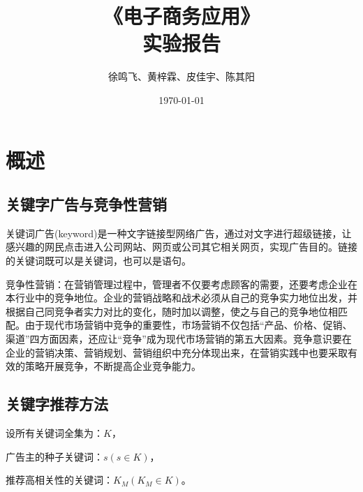 \documentclass[12pt, a4paper, oneside]{ctexbook}
\title{{\Huge{\textbf{《电子商务应用》}}}\\实验报告}
\author{徐鸣飞、黄梓霖、皮佳宇、陈其阳}
\date{\today}
\begin{document}
\maketitle

\setcounter{page}{1}



\newpage
{}
\setcounter{page}{1}
\tableofcontents
\newpage
\setcounter{page}{1}

\chapter{概述}
\section{关键字广告与竞争性营销}
关键词广告(keyword)是一种文字链接型网络广告，通过对文字进行超级链接，让感兴趣的网民点击进入公司网站、网页或公司其它相关网页，实现广告目的。链接的关键词既可以是关键词，也可以是语句。

竞争性营销：在营销管理过程中，管理者不仅要考虑顾客的需要，还要考虑企业在本行业中的竞争地位。企业的营销战略和战术必须从自己的竞争实力地位出发，并根据自己同竞争者实力对比的变化，随时加以调整，使之与自己的竞争地位相匹配。由于现代市场营销中竞争的重要性，市场营销不仅包括“产品、价格、促销、渠道”四方面因素，还应让“竞争”成为现代市场营销的第五大因素。竞争意识要在企业的营销决策、营销规划、营销组织中充分体现出来，在营销实践中也要采取有效的策略开展竞争，不断提高企业竞争能力。
\section{关键字推荐方法}
设所有关键词全集为：$K$，

广告主的种子关键词：$ s \left( s \in K \right) $，

推荐高相关性的关键词：$ K_M \left( K_M \in K \right) $。
\end{document}
